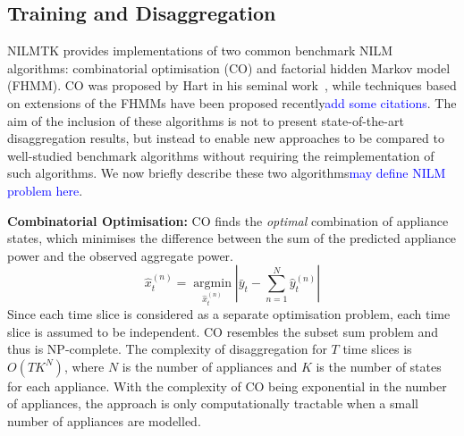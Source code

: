 \documentclass{sig-alternate}
\newcommand{\bluecolor}[1]{\textcolor{blue}{#1}}
\begin{document}
\subsection{Training and Disaggregation}
\label{sec:training}
\noindent
NILMTK provides implementations of two common benchmark NILM algorithms: combinatorial optimisation (CO) and factorial hidden Markov model (FHMM). CO was proposed by Hart in his seminal work~\cite{hart_1992}, while techniques based on extensions of the FHMMs have been proposed recently\bluecolor{add some citations}. The aim of the inclusion of these algorithms is not to present state-of-the-art disaggregation results, but instead to enable new approaches to be compared to well-studied benchmark algorithms without requiring the reimplementation of such algorithms. We now briefly describe these two algorithms\bluecolor{may define NILM problem here}.

\textbf{Combinatorial Optimisation:}
CO finds the \textit{optimal} combination of appliance states, which minimises the difference between the sum of the predicted appliance power and the observed aggregate power. 
\begin{equation}
\hat{x}^{(n)}_t=\operatorname*{arg min}_{\hat{x}^{(n)}_t}\left|\bar{y}_t-\sum\limits_{n=1}^{N}\hat{y}^{(n)}_t\right|
\end{equation}
Since each time slice is considered as a separate optimisation problem, each time slice is assumed to be independent.
CO resembles the subset sum problem and thus is NP-complete. The complexity of disaggregation for $T$ time slices is $O(TK^N)$, where $N$ is the number of appliances and $K$ is the number of states for each appliance. With the complexity of CO being exponential in the number of appliances, the approach is only computationally tractable when a small number of appliances are modelled.
\end{document}
